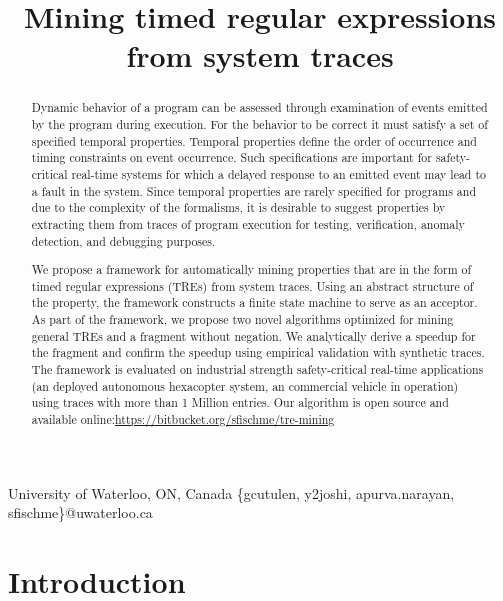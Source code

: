 \documentclass[]{sigplanconf}
\begin{document}
\title{Mining timed regular expressions from system traces}

		   {University of Waterloo, ON, Canada}
		   {\{gcutulen, y2joshi, apurva.narayan, sfischme\}@uwaterloo.ca}

\maketitle

\begin{abstract}

Dynamic behavior of a program can be assessed through examination of events emitted by the program during execution. For the behavior to be correct it must satisfy a set of specified temporal properties. Temporal properties define the order of occurrence and timing constraints on event occurrence. Such specifications are important for safety-critical real-time systems for which a delayed response to an emitted event may lead to a fault in the system. Since temporal properties are rarely specified for programs and due to the complexity of the formalisms, it is desirable to suggest properties by extracting them from traces of program execution for testing, verification, anomaly detection, and debugging purposes.

We propose a framework for automatically mining properties that are in the form of timed regular expressions (TREs) from system traces. Using an abstract structure of the property, the framework constructs a finite state machine to serve as an acceptor. As part of the framework, we propose two novel algorithms optimized for mining general TREs and a fragment without negation. We analytically derive a speedup for the fragment and confirm the speedup using empirical validation with synthetic traces. The framework is evaluated on industrial strength safety-critical real-time applications (an deployed autonomous hexacopter system, an commercial vehicle in operation) using traces with more than 1 Million entries. Our algorithm is open source and available online:\href{https://bitbucket.org/sfischme/tre-mining}{https://bitbucket.org/sfischme/tre-mining}
\end{abstract}

\section{Introduction}
\end{document}
